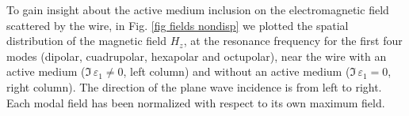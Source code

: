\documentclass[9pt,twocolumn,twoside]{osajnl}
\begin{document}




To gain insight about the active medium inclusion on the electromagnetic field scattered by the wire, in Fig. \ref{fig fields nondisp} we plotted the spatial distribution of the magnetic field $H_z$, at the resonance frequency for the first four modes (dipolar, cuadrupolar, hexapolar and octupolar),  near the wire with an active medium ($\Im\,\varepsilon_1 \neq 0$, left column) and without an active medium ($\Im\,\varepsilon_1 = 0$, right column).  The direction of the plane wave incidence is 
from  left to right.
%
Each modal field has been  normalized with respect to its own maximum field. 

\end{document}
